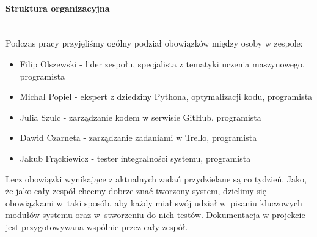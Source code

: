 \documentclass{article}
\begin{document}
\paragraph{Struktura organizacyjna}\mbox{}\\

Podczas pracy przyjęliśmy ogólny podział obowiązków między osoby w zespole:

\begin{itemize}
\item Filip Olszewski - lider zespołu, specjalista z tematyki uczenia maszynowego, programista
\item Michał Popiel - ekspert z dziedziny Pythona, optymalizacji kodu, programista
\item Julia Szulc - zarządzanie kodem w serwisie GitHub, programista
\item Dawid Czarneta - zarządzanie zadaniami w Trello, programista
\item Jakub Frąckiewicz - tester integralności systemu, programista
\end{itemize}
Lecz obowiązki wynikające z aktualnych zadań przydzielane są co tydzień. Jako, że jako cały zespół chcemy dobrze znać tworzony system, dzielimy się obowiązkami w~taki sposób, aby każdy miał swój udział w~pisaniu  kluczowych modułów systemu oraz w~stworzeniu do nich testów.
Dokumentacja w projekcie jest przygotowywana wspólnie przez cały zespół.
\end{document}
